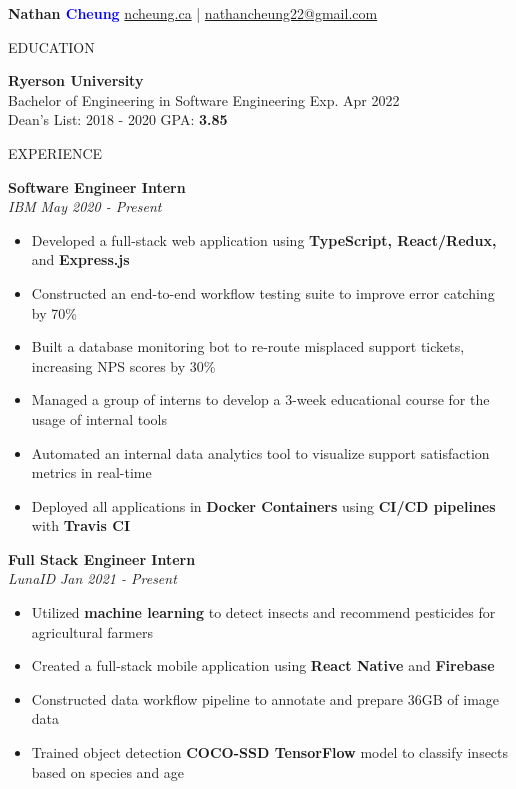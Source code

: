 \documentclass[letterpaper,11pt,oneside]{article}
\newcommand{\createHeading}[1]{
    \vspace{1.25em}
    \hline
    \vspace{-1.5ex}
    \begin{center}
        #1
    \end{center}
    \vspace{-1.5ex}
    \hline
    \vspace{1.25em}
}
\begin{document}

\noindent \huge{\textbf{Nathan \textcolor{blue}{Cheung}}} \hfill \normalsize{\href{https://ncheung.ca}{ncheung.ca} | \href{mailto:nathancheung22@gmail.com}{nathancheung22@gmail.com}}




\createHeading{EDUCATION}
\begin{addmargin}[.6em]{.6em}
    \textbf{Ryerson University} \\
    Bachelor of Engineering in Software Engineering \hfill Exp. Apr 2022 \\
    Dean's List: 2018 - 2020 \hfill GPA: \textbf{3.85}
\end{addmargin}

\createHeading{EXPERIENCE}
\begin{addmargin}[.6em]{.6em}
    \textbf{Software Engineer Intern} \\
    \textit{IBM} \hfill \textit{May 2020 - Present}
    \begin{itemize}
        \item Developed a full-stack web application using \textbf{TypeScript, React/Redux,} and \textbf{Express.js}
        \item Constructed an end-to-end workflow testing suite to improve error catching by 70\%
        \item Built a database monitoring bot to re-route misplaced support tickets, increasing NPS scores by 30\%
        \item Managed a group of interns to develop a 3-week educational course for the usage of internal tools
        \item Automated an internal data analytics tool to visualize support satisfaction metrics in real-time
        \item Deployed all applications in \textbf{Docker Containers} using \textbf{CI/CD pipelines} with \textbf{Travis CI}
    \end{itemize}
    \vspace{1.25em}
    \textbf{Full Stack Engineer Intern} \\
    \textit{LunaID} \hfill \textit{Jan 2021 - Present}
    \begin{itemize}
        \item Utilized \textbf{machine learning} to detect insects and recommend pesticides for agricultural farmers
        \item Created a full-stack mobile application using \textbf{React Native} and \textbf{Firebase}
        \item Constructed data workflow pipeline to annotate and prepare 36GB of image data
        \item Trained object detection \textbf{COCO-SSD TensorFlow} model to classify insects based on species and age
    \end{itemize}
    \vspace{0.5em}
\end{addmargin}
\end{document}
